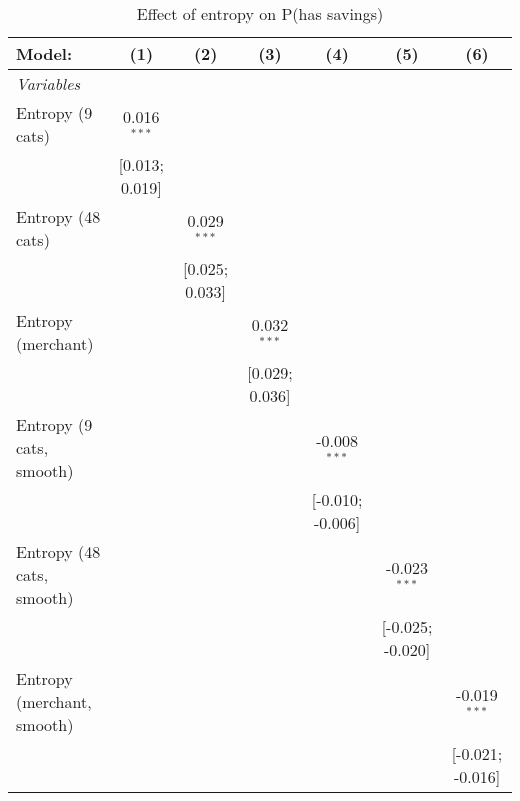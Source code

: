 
\begin{table}[htbp]
   \centering
   \tiny
   \begin{threeparttable}[b]
      \caption{\label{tab:reg_has_inflows_main} Effect of entropy on P(has savings)}
      \begin{tabular}{lcccccc}
         \tabularnewline \midrule \midrule
         Model:                     & (1)             & (2)             & (3)             & (4)              & (5)              & (6)\\  
         \midrule
         \emph{Variables}\\
         Entropy (9 cats)           & 0.016$^{***}$   &                 &                 &                  &                  &   \\   
                                    & [0.013; 0.019]  &                 &                 &                  &                  &   \\   
         Entropy (48 cats)          &                 & 0.029$^{***}$   &                 &                  &                  &   \\   
                                    &                 & [0.025; 0.033]  &                 &                  &                  &   \\   
         Entropy (merchant)         &                 &                 & 0.032$^{***}$   &                  &                  &   \\   
                                    &                 &                 & [0.029; 0.036]  &                  &                  &   \\   
         Entropy (9 cats, smooth)   &                 &                 &                 & -0.008$^{***}$   &                  &   \\   
                                    &                 &                 &                 & [-0.010; -0.006] &                  &   \\   
         Entropy (48 cats, smooth)  &                 &                 &                 &                  & -0.023$^{***}$   &   \\   
                                    &                 &                 &                 &                  & [-0.025; -0.020] &   \\   
         Entropy (merchant, smooth) &                 &                 &                 &                  &                  & -0.019$^{***}$\\   
                                    &                 &                 &                 &                  &                  & [-0.021; -0.016]\\   

\end{tabular}
\end{threeparttable}
\end{table}
